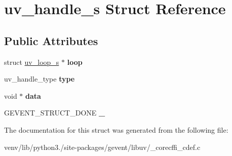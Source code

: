 \hypertarget{structuv__handle__s}{}\section{uv\+\_\+handle\+\_\+s Struct Reference}
\label{structuv__handle__s}
\subsection*{Public Attributes}
\begin{DoxyCompactItemize}
\item 
\mbox{\label{structuv__handle__s_ae5d78817ebcf7e341f61e8743d5218f7}} 
struct \hyperlink{structuv__loop__s}{uv\+\_\+loop\+\_\+s} $\ast$ {\bfseries loop}
\item 
\mbox{\label{structuv__handle__s_a2c6de970e9c6135e546fb2a3835b9102}} 
uv\+\_\+handle\+\_\+type {\bfseries type}
\item 
\mbox{\label{structuv__handle__s_a6fd13a143fb4a31020d67a54ff54792a}} 
void $\ast$ {\bfseries data}
\item 
\mbox{\label{structuv__handle__s_a86a7014446cd501eae23ecb9bd455bd8}} 
G\+E\+V\+E\+N\+T\+\_\+\+S\+T\+R\+U\+C\+T\+\_\+\+D\+O\+NE {\bfseries \+\_\+}
\end{DoxyCompactItemize}


The documentation for this struct was generated from the following file\+:\begin{DoxyCompactItemize}
\item 
venv/lib/python3./site-\/packages/gevent/libuv/\+\_\+corecffi\+\_\+cdef.\+c\end{DoxyCompactItemize}

